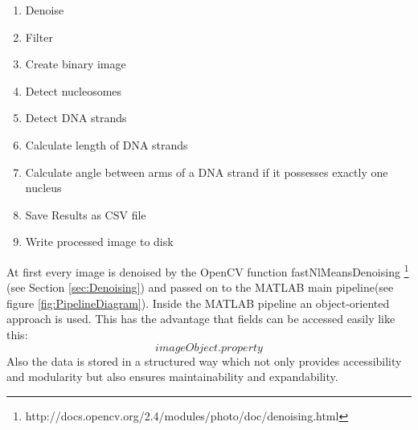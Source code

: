 \documentclass{article}
\begin{document}
\begin{enumerate}
	\item Denoise
	\item Filter
	\item Create binary image
	\item Detect nucleosomes %
	\item Detect DNA strands 
	\item Calculate length of DNA strands
	\item Calculate angle between arms of a DNA strand if it possesses exactly one nucleus
	\item Save Results as CSV file
	\item Write processed image to disk
	
\end{enumerate}

At first every image is denoised by the OpenCV function fastNlMeansDenoising \footnote{http://docs.opencv.org/2.4/modules/photo/doc/denoising.html}
(see Section \ref{sec:Denoising}) and passed on to the MATLAB main pipeline(see figure \ref{fig:PipelineDiagram}).
Inside the MATLAB pipeline an object-oriented approach is used.
This has the advantage that fields can be accessed easily like this:
\[
imageObject.property
\]
Also the data is stored in a structured way which not only provides accessibility and modularity but also ensures maintainability and expandability.
\end{document}
